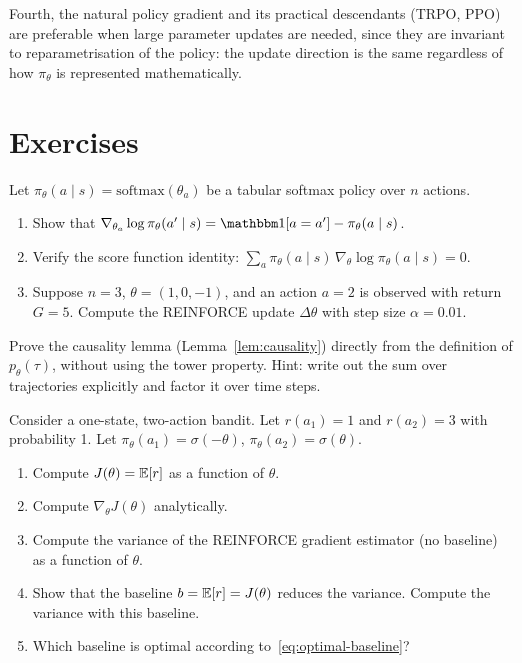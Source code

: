 Fourth, the natural policy gradient and its practical descendants (TRPO, PPO) are preferable when large parameter updates are needed, since they are invariant to reparametrisation of the policy: the update direction is the same regardless of how $\pi_\theta$ is represented mathematically.

\section*{Exercises}

\begin{exercise}
\label{ex:pg-score}
Let $\pi_\theta(a \mid s) = \mathrm{softmax}(\theta_a)$ be a tabular softmax policy over $n$ actions.
\begin{enumerate}
\item Show that $\nabla_{\theta_a} \log \pi_\theta(a' \mid s) = \ind[a = a'] - \pi_\theta(a \mid s)$.
\item Verify the score function identity: $\sum_{a} \pi_\theta(a \mid s)\, \nabla_\theta \log \pi_\theta(a \mid s) = 0$.
\item Suppose $n = 3$, $\theta = (1, 0, -1)$, and an action $a = 2$ is observed with return $G = 5$.  Compute the REINFORCE update $\Delta\theta$ with step size $\alpha = 0.01$.
\end{enumerate}
\end{exercise}

\begin{exercise}
\label{ex:pg-causality}
Prove the causality lemma (Lemma~\ref{lem:causality}) directly from the definition of $p_\theta(\tau)$, without using the tower property.  Hint: write out the sum over trajectories explicitly and factor it over time steps.
\end{exercise}

\begin{exercise}
\label{ex:pg-baseline-variance}
Consider a one-state, two-action bandit.  Let $r(a_1) = 1$ and $r(a_2) = 3$ with probability 1.  Let $\pi_\theta(a_1) = \sigma(-\theta)$, $\pi_\theta(a_2) = \sigma(\theta)$.
\begin{enumerate}
\item Compute $J(\theta) = \operatorname{\mathbb{E}}[r]$ as a function of $\theta$.
\item Compute $\nabla_\theta J(\theta)$ analytically.
\item Compute the variance of the REINFORCE gradient estimator (no baseline) as a function of $\theta$.
\item Show that the baseline $b = \operatorname{\mathbb{E}}[r] = J(\theta)$ reduces the variance.  Compute the variance with this baseline.
\item Which baseline is optimal according to~\eqref{eq:optimal-baseline}?
\end{enumerate}
\end{exercise}


